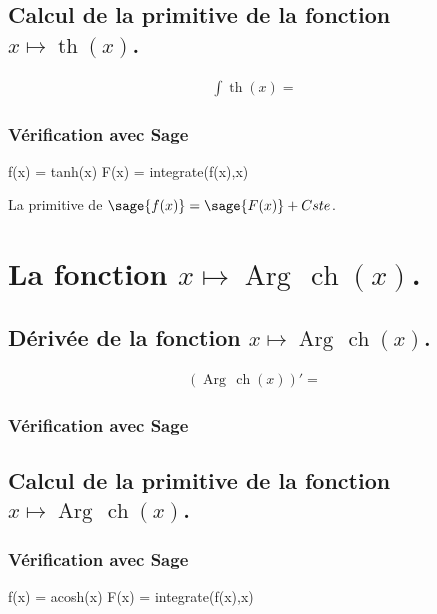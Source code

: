 \documentclass[a4paper,14pt]{extreport} %
\renewcommand{\cosh}{\mathop{\mathrm{ch}}}
\renewcommand{\tanh}{\mathop{\mathrm{th}}}
\renewcommand{\arg}{\mathop{\mathrm{Arg\,}}}
\begin{document}
\subsection{Calcul de la primitive de la fonction  $x \mapsto \tanh(x)$.}


\begin{align*}
\int \tanh(x) =& 
\end{align*}


\subsubsection{Vérification avec Sage}


\begin{sageblock}
    f(x) = tanh(x)
    F(x) = integrate(f(x),x)
\end{sageblock}

La primitive de $\sage{f(x)} = \sage{F(x)} + Cste $.




\section{La fonction  $x \mapsto \arg \cosh(x)$.}


\subsection{Dérivée de la fonction $x \mapsto \arg \cosh(x)$.}

\begin{align*}
(\arg \cosh(x))' = &
\end{align*}


\subsubsection{Vérification avec Sage}


\subsection{Calcul de la primitive de la fonction  $x \mapsto \arg \cosh(x)$.}



\subsubsection{Vérification avec Sage}

\begin{sageblock}
    f(x) = acosh(x)
    F(x) = integrate(f(x),x)
\end{sageblock}
\end{document}
